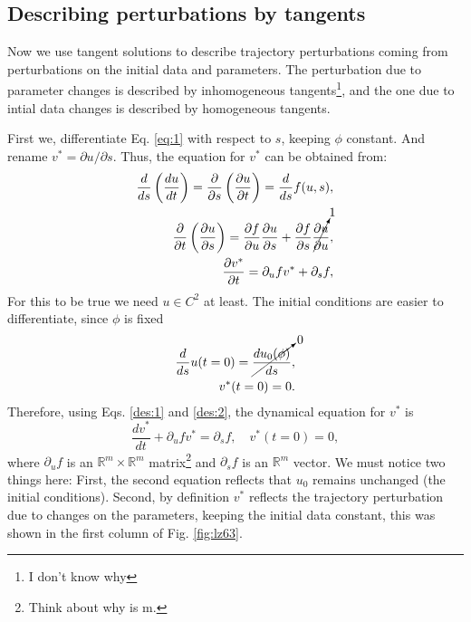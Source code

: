 \documentclass[10pt,twoside,a4paper]{article} %
\begin{document}
\subsection{Describing perturbations by tangents}\label{3.1}

Now we use tangent solutions to describe trajectory perturbations coming from perturbations on the initial data and parameters. The perturbation due to parameter changes is described by inhomogeneous tangents\footnote{I don't know why}, and the one due to intial data changes is described by homogeneous tangents.

First we, differentiate Eq. \ref{eq:1} with respect to $s$, keeping $\phi$ constant. And rename $v^* = \partial u/ \partial s$. Thus, the equation for $v^*$ can be obtained from:
\begin{eqnarray}
  \frac{d}{ds} \left( \frac{du}{dt} \right)  = \frac{\partial }{\partial s} \left( \frac{\partial u}{\partial t} \right)= \frac{d}{ds}f(u,s),\nonumber\\
  \frac{\partial }{\partial t} \left( \frac{\partial u}{\partial s} \right) = \frac{\partial f}{\partial u} \frac{\partial u}{\partial s} + \frac{\partial f}{\partial s}\cancelto{1}{\frac{\partial u}{\partial u}},\nonumber\\
  \frac{\partial v^*}{\partial t}  = \partial_u fv^* + \partial_s f,
  \label{des:1}
\end{eqnarray}
For this to be true we need $u\in C^2$ at least. The initial conditions are easier to differentiate, since $\phi$ is fixed
\begin{eqnarray}
  \frac{d}{ds} u(t=0) = \cancelto{0}{\frac{d u_0(\phi)}{ds}},\nonumber\\
  v^*(t=0) = 0.\label{des:2}
\end{eqnarray}
Therefore, using Eqs. \ref{des:1} and \ref{des:2}, the dynamical equation for $v^*$ is
\begin{equation}
  \frac{dv^*}{dt} + \partial_u fv^* = \partial_s f, \quad v^*(t=0) = 0
  \label{eq:4}
,\end{equation}
where $\partial_u f$ is an $\mathbb{R}^m\times\mathbb{R}^m$ matrix\footnote{Think about why is m.} and $\partial_sf$ is an $\mathbb{R}^m$ vector. We must notice two things here: First, the second equation reflects that $u_0$ remains unchanged (the initial conditions). Second, by definition $v^*$ reflects the trajectory perturbation due to changes on the parameters, keeping the initial data constant, this was shown in the first column of Fig. \ref{fig:lz63}.
\end{document}
